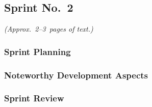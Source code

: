 \subsection{Sprint No.~2}

\emph{(Approx.~2--3~pages of text.)}

\subsubsection*{Sprint Planning}

\subsubsection*{Noteworthy Development Aspects}

\subsubsection*{Sprint Review}


